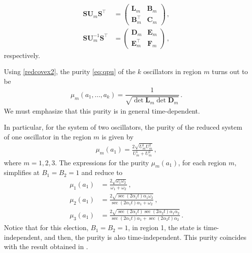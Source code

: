 \documentclass[12pt]{iopart}
\begin{document}
\begin{subequations}
\begin{align}
\boldsymbol{S} \boldsymbol{U}_m\boldsymbol{S}^{\intercal}&=\left(\begin{array}{cc} \boldsymbol{L}_m & \boldsymbol{B}_m \\ \boldsymbol{B}^{\intercal}_m & \boldsymbol{C}_m\end{array}\right)\,,\\
\boldsymbol{S} \boldsymbol{U}_m^{-1}\boldsymbol{S}^{\intercal}&=\left(\begin{array}{cc} \boldsymbol{D}_m & \boldsymbol{E}_m \\ \boldsymbol{E}^{\intercal}_m & \boldsymbol{F}_m\end{array}\right)\,,
\end{align}
\end{subequations}
respectively.

Using \eqref{redcovex2}, the  purity \eqref{eq:qpu} of the $k$ oscillators in region $m$ turns out to be 
\begin{align}\label{classpurity}
\mu_m (a_1,\dots,a_k)=\dfrac{1}{\sqrt{\det \boldsymbol{L}_m \det \boldsymbol{D}_m }}\, .
\end{align}
We must emphasize that this purity is in general time-dependent.

In particular, for the system of two oscillators, the purity of the reduced system of one oscillator in the region $m$ is given by
\begin{align}
\mu_m(a_1)=\frac{2\sqrt{U_{m}^1U^2_{m}}}{U^1_{m}+U^2_{m}}\,,
\label{Puritydos}
\end{align}
where ${m}={ 1,2,3}$. The expressions for the purity $\mu_m(a_1)$, for each region $m$, simplifies at $B_1=B_2=1$ and reduce to
\begin{subequations}
\begin{align}
\mu_1(a_1) &=\frac{2\sqrt{\omega_1\omega_2}}{\omega_1+\omega_2}\,,\\
\mu_2(a_1) &=\frac{2\sqrt{\sec(2 \alpha_1 t)\alpha_1\omega_2}}{\sec(2 \alpha_1 t)\alpha_1+\omega_2}\,,\\
\mu_3(a_1) &=\frac{2\sqrt{\sec(2 \alpha_1 t)\sec(2\alpha_2 t)\alpha_1\alpha_2}}{\sec(2 \alpha_1 t)\alpha_1+\sec(2 \alpha_2 t)\alpha_2} \,.
\end{align}
\end{subequations}
Notice that for this election, $B_1=B_2=1$, in region 1, the state is time-independent, and then, the purity is also time-independent. This purity coincides with the result obtained in \cite{Diaz2022}.
\end{document}
